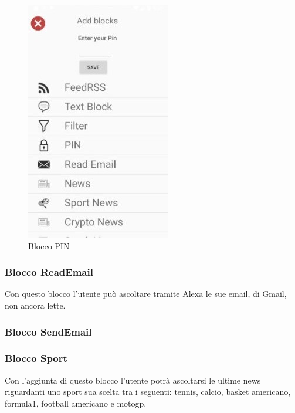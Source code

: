 \begin{figure}[!ht]
	\centering
	\includegraphics[scale=0.4]{images/BlockPIN.jpg}
	\caption{Blocco PIN}
\end{figure}

\subsubsection{Blocco ReadEmail}
Con questo blocco l'utente può ascoltare tramite Alexa le sue email, di Gmail, non ancora lette.


\subsubsection{Blocco SendEmail}

\subsubsection{Blocco Sport}
Con l'aggiunta di questo blocco l'utente potrà ascoltarsi le ultime news riguardanti uno sport sua scelta tra i seguenti: tennis, calcio, basket americano, formula1, football americano e motogp.

